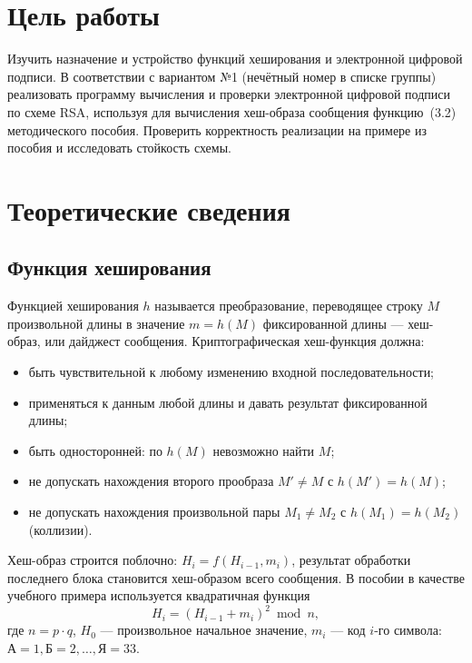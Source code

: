 \documentclass[14pt,a4paper]{extarticle}
\begin{document}

\tableofcontents

\section{Цель работы}

Изучить назначение и устройство функций хеширования и электронной цифровой подписи.
В соответствии с вариантом №1 (нечётный номер в списке группы) реализовать программу
вычисления и проверки электронной цифровой подписи по схеме RSA, используя для
вычисления хеш-образа сообщения функцию~(3.2) методического пособия. Проверить
корректность реализации на примере из пособия и исследовать стойкость схемы.

\section{Теоретические сведения}

\subsection{Функция хеширования}

Функцией хеширования $h$ называется преобразование, переводящее строку $M$
произвольной длины в значение $m = h(M)$ фиксированной длины --- хеш-образ, или
дайджест сообщения. Криптографическая хеш-функция должна:
\begin{itemize}
\item быть чувствительной к любому изменению входной последовательности;
\item применяться к данным любой длины и давать результат фиксированной длины;
\item быть односторонней: по $h(M)$ невозможно найти $M$;
\item не допускать нахождения второго прообраза $M' \ne M$ с $h(M') = h(M)$;
\item не допускать нахождения произвольной пары $M_1 \ne M_2$ с $h(M_1) = h(M_2)$
(коллизии).
\end{itemize}

Хеш-образ строится поблочно: $H_i = f(H_{i-1}, m_i)$, результат обработки последнего
блока становится хеш-образом всего сообщения. В пособии в качестве учебного примера
используется квадратичная функция
\begin{equation}
H_i = (H_{i-1} + m_i)^2 \bmod n,
\end{equation}
где $n = p \cdot q$, $H_0$ --- произвольное начальное значение, $m_i$ --- код $i$-го
символа: $\text{А} = 1, \text{Б} = 2, \dots, \text{Я} = 33$.
\end{document}
